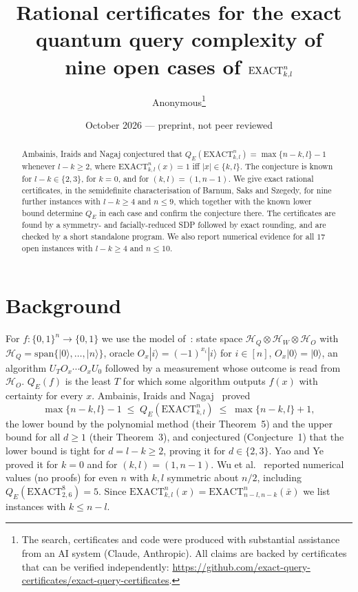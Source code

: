 \documentclass[11pt]{article}
\title{Rational certificates for the exact quantum query complexity of\\ nine open cases of $\EX{k}{l}{n}$}
\author{Anonymous\thanks{The search, certificates and code were produced with substantial
assistance from an AI system (Claude, Anthropic). All claims are backed by certificates that can be
verified independently: \url{https://github.com/exact-query-certificates/exact-query-certificates}.}}
\date{October 2026 --- preprint, not peer reviewed}
\theoremstyle{remark}
\newcommand{\QE}{Q_E}
\newcommand{\EX}[3]{\mathrm{EXACT}_{#1,#2}^{#3}}
\begin{document}
\maketitle

\begin{abstract}
Ambainis, Iraids and Nagaj conjectured that $\QE(\EX{k}{l}{n})=\max\{n-k,l\}-1$ whenever $l-k\ge 2$,
where $\EX{k}{l}{n}(x)=1$ iff $|x|\in\{k,l\}$. The conjecture is known for $l-k\in\{2,3\}$, for $k=0$,
and for $(k,l)=(1,n-1)$. We give exact rational certificates, in the semidefinite characterisation of
Barnum, Saks and Szegedy, for nine further instances with $l-k\ge 4$ and $n\le 9$, which together with the
known lower bound determine $\QE$ in each case and confirm the conjecture there. The certificates are
found by a symmetry- and facially-reduced SDP followed by exact rounding, and are checked by a short
standalone program. We also report numerical evidence for all $17$ open instances with $l-k\ge4$ and
$n\le 10$.
\end{abstract}

\section{Background}
For $f:\{0,1\}^n\to\{0,1\}$ we use the model of~\cite{AIN}: state space
$\mathcal H_Q\otimes\mathcal H_W\otimes\mathcal H_O$ with $\mathcal H_Q=\mathrm{span}\{|0\rangle,\dots,|n\rangle\}$,
oracle $O_x|i\rangle=(-1)^{x_i}|i\rangle$ for $i\in[n]$, $O_x|0\rangle=|0\rangle$, an algorithm
$U_TO_x\cdots O_xU_0$ followed by a measurement whose outcome is read from $\mathcal H_O$. $\QE(f)$ is the
least $T$ for which some algorithm outputs $f(x)$ with certainty for every $x$.
Ambainis, Iraids and Nagaj~\cite{AIN} proved
\begin{equation}\label{eq:bounds}
\max\{n-k,l\}-1\;\le\;\QE(\EX{k}{l}{n})\;\le\;\max\{n-k,l\}+1,
\end{equation}
the lower bound by the polynomial method (their Theorem~5) and the upper bound for all $d\ge1$ (their
Theorem~3), and conjectured (Conjecture~1) that the lower bound is tight for $d=l-k\ge2$, proving it for
$d\in\{2,3\}$. Yao and Ye~\cite{YY} proved it for $k=0$ and for
$(k,l)=(1,n-1)$. Wu et al.~\cite{Wu} reported numerical values (no proofs) for even $n$ with $k,l$
symmetric about $n/2$, including $\QE(\EX{2}{6}{8})=5$. Since $\EX{k}{l}{n}(x)=\EX{n-l}{n-k}{n}(\bar x)$ we list
instances with $k\le n-l$.
\end{document}
